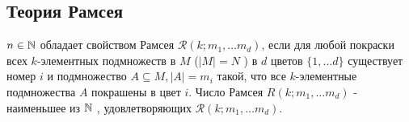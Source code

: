 \documentclass[12pt]{article}
\begin{document}
\subsection{Теория Рамсея}
\begin{defn}
    $n \in  \mathbb{N}$ обладает свойством Рамсея $\mathcal{R}(k; m_1, \ldots m_d)$, если для любой покраски всех $k$-элементных подмножеств в $M$ ($|M| = N$ ) в $d$ цветов $\{1, \ldots d\}$ существует номер $i$ и подмножество $A \subseteq M, |A| = m_i$ такой, что все $k$-элементные подмножества $A$ покрашены в цвет $i$.
    Число Рамсея $R(k; m_1, \ldots  m_d)$ - наименьшее из $\mathbb{N}$ , удовлетворяющих $\mathcal{R}(k; m_1, \ldots m_d).$
\end{defn}
\end{document}
